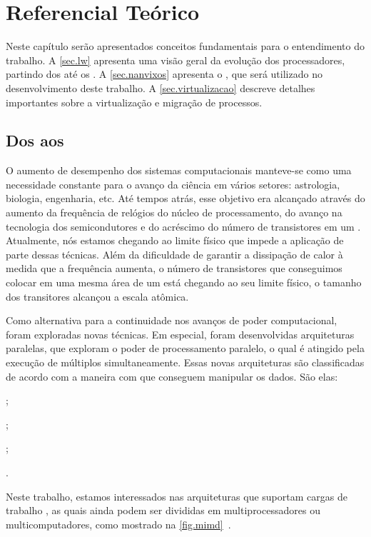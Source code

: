\chapter{Referencial Teórico}
\label{chap.background}

Neste capítulo serão apresentados conceitos fundamentais para o entendimento do trabalho. A \autoref{sec.lw} apresenta uma visão geral da evolução dos processadores, partindo dos \singlecores até os \lws. A \autoref{sec.nanvixos} apresenta o \nanvix, \so que será utilizado no desenvolvimento deste trabalho. A \autoref{sec.virtualizacao} descreve detalhes importantes sobre a virtualização e migração de processos.

\section{Dos \singlecores aos \Lws}
\label{sec.lw}

O aumento de desempenho dos sistemas computacionais manteve-se como uma necessidade constante para o avanço da ciência em vários setores: astrologia, biologia, engenharia, etc. Até tempos atrás, esse objetivo era alcançado através do aumento da frequência de relógios do núcleo de processamento, do avanço na tecnologia dos semicondutores e do acréscimo do número de transistores em um \chip. Atualmente, nós estamos chegando ao limite físico que impede a aplicação de parte dessas técnicas. Além da dificuldade de garantir a dissipação de calor à medida que a frequência aumenta, o número de transistores que conseguimos colocar em uma mesma área de um \chip está chegando ao seu limite físico, \ie o tamanho dos transitores alcançou a escala atômica.

Como alternativa para a continuidade nos avanços de poder computacional, foram exploradas novas técnicas. Em especial, foram desenvolvidas arquiteturas paralelas, que exploram o poder de processamento paralelo, o qual é atingido pela execução de múltiplos \cores simultaneamente. Essas novas arquiteturas são classificadas de acordo com a maneira com que conseguem manipular os dados. São elas:
\begin{inlinelist}
    \item \sisd;
    \item \simd;
    \item \misd;
    \item \mimd.
\end{inlinelist}
Neste trabalho, estamos interessados nas arquiteturas que suportam cargas de trabalho \mimd, as quais ainda podem ser divididas em multiprocessadores ou multicomputadores, como mostrado na \autoref{fig.mimd}~\cite{tanenbaum:4ed}.

